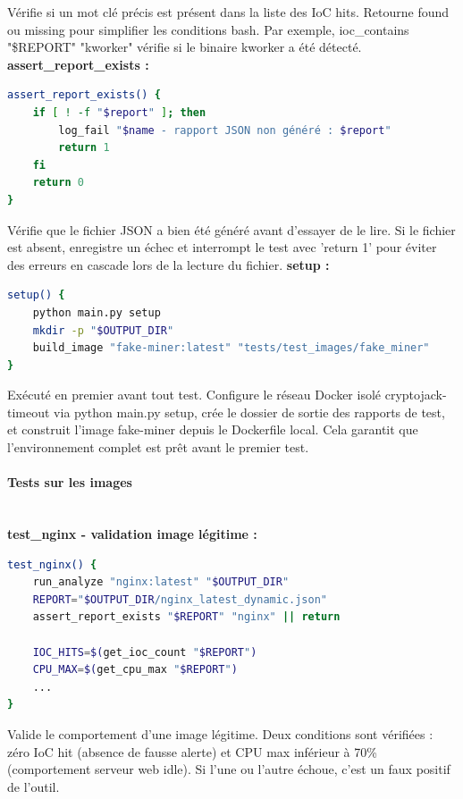 Vérifie si un mot clé précis est présent dans la liste des IoC hits. Retourne found ou missing pour simplifier les conditions bash. Par exemple, ioc\_contains "\$REPORT" "kworker" vérifie si le binaire kworker a été détecté.
\textbf{assert\_report\_exists :}  \\
\begin{lstlisting}[language=bash, caption=assert\_report\_exists]
assert_report_exists() {
    if [ ! -f "$report" ]; then
        log_fail "$name - rapport JSON non généré : $report"
        return 1
    fi
    return 0
}
\end{lstlisting}
Vérifie que le fichier JSON a bien été généré avant d'essayer de le lire. Si le fichier est absent, enregistre un échec et interrompt le test avec 'return 1' pour éviter des erreurs en cascade lors de la lecture du fichier.
\textbf{setup :}  \\
\begin{lstlisting}[language=bash, caption=setup]
setup() {
    python main.py setup
    mkdir -p "$OUTPUT_DIR"
    build_image "fake-miner:latest" "tests/test_images/fake_miner"
}
\end{lstlisting}
Exécuté en premier avant tout test. Configure le réseau Docker isolé cryptojack-timeout via python main.py setup, crée le dossier de sortie des rapports de test, et construit l'image fake-miner depuis le Dockerfile local. Cela garantit que l'environnement complet est prêt avant le premier test.

\paragraph{Tests sur les images} \mbox{} \\
\textbf{test\_nginx - validation image légitime :}  \\
\begin{lstlisting}[language=bash, caption=Test nginx]
test_nginx() {
    run_analyze "nginx:latest" "$OUTPUT_DIR"
    REPORT="$OUTPUT_DIR/nginx_latest_dynamic.json"
    assert_report_exists "$REPORT" "nginx" || return

    IOC_HITS=$(get_ioc_count "$REPORT")
    CPU_MAX=$(get_cpu_max "$REPORT")
    ...
}
\end{lstlisting}
Valide le comportement d'une image légitime. Deux conditions sont vérifiées : zéro IoC hit (absence de fausse alerte) et CPU max inférieur à 70\% (comportement serveur web idle). Si l'une ou l'autre échoue, c'est un faux positif de l'outil. \\

